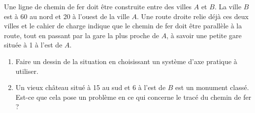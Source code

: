 
Une ligne de chemin de fer doit être construite entre des villes \( A\) et \( B\). La ville \( B\) est à \unit{60}{\kilo\meter} au nord et \unit{20}{\kilo\meter} à l'ouest de la ville \( A\). Une route droite relie déjà ces deux villes et le cahier de charge indique que le chemin de fer doit être parallèle à la route, tout en passant par la gare la plus proche de \( A\), à savoir une petite gare située à \unit{1}{\kilo\meter} à l'est de \( A\).

\begin{enumerate}
    \item
        Faire un dessin de la situation en choisissant un système d'axe pratique à utiliser.
    \item
        Un vieux château situé à \unit{15}{\kilo\meter} au sud et \unit{6}{\kilo\meter} à l'est de \( B\) est un monument classé. Est-ce que cela pose un problème en ce qui concerne le tracé du chemin de fer ?
\end{enumerate}
